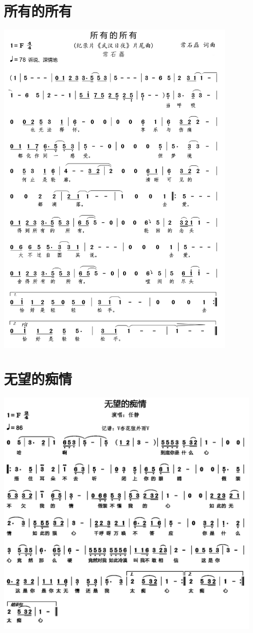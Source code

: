 \documentclass[cn,pad,twocol]{elegantbook}
\begin{document}
\section{所有的所有} \includegraphics[width=0.9\textwidth]{rpi400/20210206所有的所有.png}
\section{无望的痴情} \includegraphics[width=\textwidth]{rpi400/20210206无望的痴情.png}
\end{document}
